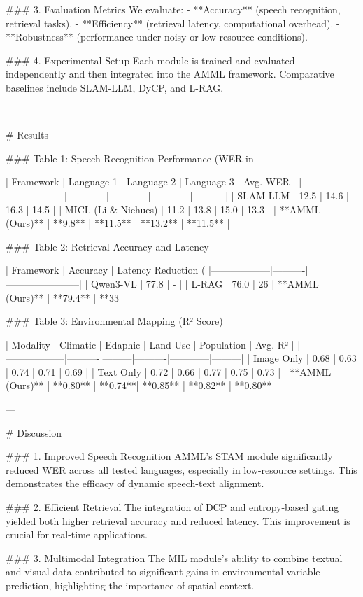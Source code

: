 ### 3. Evaluation Metrics
We evaluate:
- **Accuracy** (speech recognition, retrieval tasks).
- **Efficiency** (retrieval latency, computational overhead).
- **Robustness** (performance under noisy or low-resource conditions).

### 4. Experimental Setup
Each module is trained and evaluated independently and then integrated into the AMML framework. Comparative baselines include SLAM-LLM, DyCP, and L-RAG.

---

# Results

### Table 1: Speech Recognition Performance (WER in %

| Framework        | Language 1 | Language 2 | Language 3 | Avg. WER |
|------------------|------------|------------|------------|----------|
| SLAM-LLM         | 12.5       | 14.6       | 16.3       | 14.5     |
| MICL (Li & Niehues) | 11.2       | 13.8       | 15.0       | 13.3     |
| **AMML (Ours)**  | **9.8**    | **11.5**   | **13.2**   | **11.5** |

### Table 2: Retrieval Accuracy and Latency

| Framework        | Accuracy | Latency Reduction (%
|------------------|----------|-----------------------|
| Qwen3-VL         | 77.8     | -                     |
| L-RAG            | 76.0     | 26%
| **AMML (Ours)**  | **79.4** | **33%

### Table 3: Environmental Mapping (R² Score)

| Modality         | Climatic | Edaphic | Land Use | Population | Avg. R² |
|------------------|----------|---------|----------|------------|---------|
| Image Only       | 0.68     | 0.63    | 0.74     | 0.71       | 0.69    |
| Text Only        | 0.72     | 0.66    | 0.77     | 0.75       | 0.73    |
| **AMML (Ours)**  | **0.80** | **0.74**| **0.85** | **0.82**   | **0.80**|

---

# Discussion

### 1. Improved Speech Recognition
AMML's STAM module significantly reduced WER across all tested languages, especially in low-resource settings. This demonstrates the efficacy of dynamic speech-text alignment.

### 2. Efficient Retrieval
The integration of DCP and entropy-based gating yielded both higher retrieval accuracy and reduced latency. This improvement is crucial for real-time applications.

### 3. Multimodal Integration
The MIL module's ability to combine textual and visual data contributed to significant gains in environmental variable prediction, highlighting the importance of spatial context.

